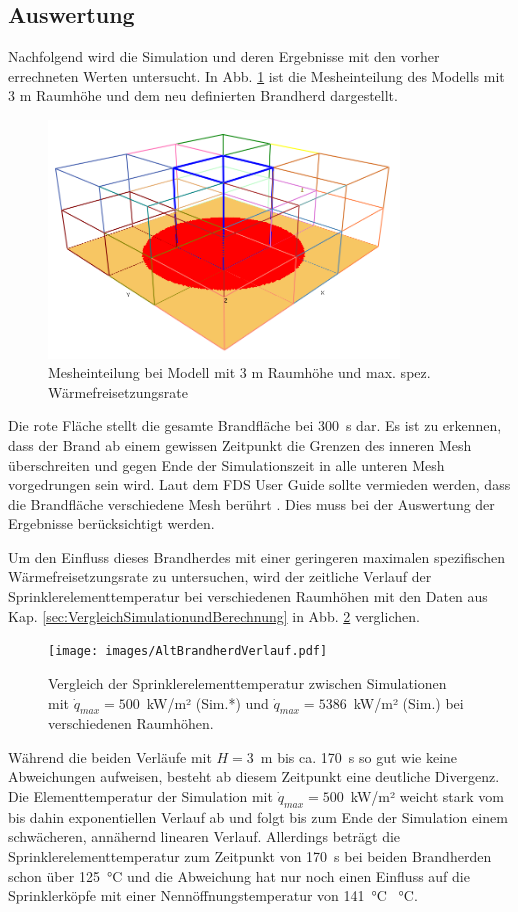 \subsection{Auswertung}
Nachfolgend wird die Simulation und deren Ergebnisse mit den vorher errechneten Werten untersucht. 
In Abb. \ref{fig:MesheinteilungmitgrBrandherd} ist die Mesheinteilung des Modells mit 3 m Raumhöhe und dem neu definierten Brandherd dargestellt.
\begin{figure}
    \centering
    \includegraphics[width=0.83\textwidth]{images/ModellmitgrBrandherd.png}
    \caption{Mesheinteilung bei Modell mit 3 m Raumhöhe und max. spez. Wärmefreisetzungsrate}
    \label{fig:MesheinteilungmitgrBrandherd}
\end{figure}
Die rote Fläche stellt die gesamte Brandfläche bei 300~s dar. Es ist zu erkennen, dass der Brand ab einem gewissen Zeitpunkt die Grenzen des inneren Mesh überschreiten und gegen Ende der Simulationszeit in alle unteren Mesh vorgedrungen sein wird. Laut dem FDS User Guide sollte vermieden werden, dass die Brandfläche verschiedene Mesh berührt \cite[S. 40]{FDSUser}. Dies muss bei der Auswertung der Ergebnisse berücksichtigt werden.

Um den Einfluss dieses Brandherdes mit einer geringeren maximalen spezifischen Wärmefreisetzungsrate zu untersuchen, wird der zeitliche Verlauf der Sprinklerelementtemperatur bei verschiedenen Raumhöhen mit den Daten aus Kap. \ref{sec:VergleichSimulationundBerechnung} in Abb. \ref{fig:AltBrandherdVerlauf} verglichen. 
\begin{figure}
    \centering
    \texttt{[image: images/AltBrandherdVerlauf.pdf]}
    \caption{Vergleich der Sprinklerelementtemperatur zwischen Simulationen mit $\Dot{q}_{max}=500$~kW/m² (Sim.*) und $\Dot{q}_{max}=5386$~kW/m² (Sim.) bei verschiedenen Raumhöhen.}
    \label{fig:AltBrandherdVerlauf}
\end{figure}
Während die beiden Verläufe mit $H=3$~m bis ca. 170~s so gut wie keine Abweichungen aufweisen, besteht ab diesem Zeitpunkt eine deutliche Divergenz. Die Elementtemperatur der Simulation mit $\Dot{q}_{max}=500$~kW/m² weicht stark vom bis dahin exponentiellen Verlauf ab und folgt bis zum Ende der Simulation einem schwächeren, annähernd linearen Verlauf. 
Allerdings beträgt die Sprinklerelementtemperatur zum Zeitpunkt von 170~s bei beiden Brandherden schon über 125~°C und die Abweichung hat nur noch einen Einfluss auf die Sprinklerköpfe mit einer Nennöffnungstemperatur von 141~°C ~°C. 


